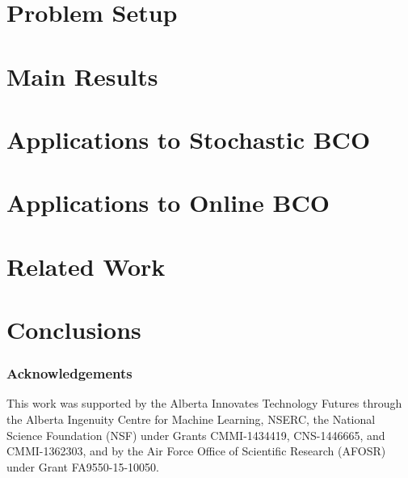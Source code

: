 \documentclass[twoside]{article}
\begin{document}
\section{Problem Setup}
\label{sec:problem}


\section{Main Results}
\label{sec:results}


\section{Applications to Stochastic BCO}
\label{sec:sbco}


\section{Applications to Online BCO}
\label{sec:obco}


\section{Related Work}
\label{sec:related}


%

\section{Conclusions}
\label{sec:conc}


\subsubsection*{Acknowledgements}
This work was supported by the Alberta Innovates Technology Futures through the Alberta Ingenuity Centre for Machine Learning, NSERC, the National Science Foundation (NSF) under Grants CMMI-1434419, CNS-1446665, and CMMI-1362303, and by the Air Force Office of Scientific Research (AFOSR) under Grant FA9550-15-10050.

\clearpage\newpage





\clearpage\newpage
\onecolumn
\appendix

\end{document}
